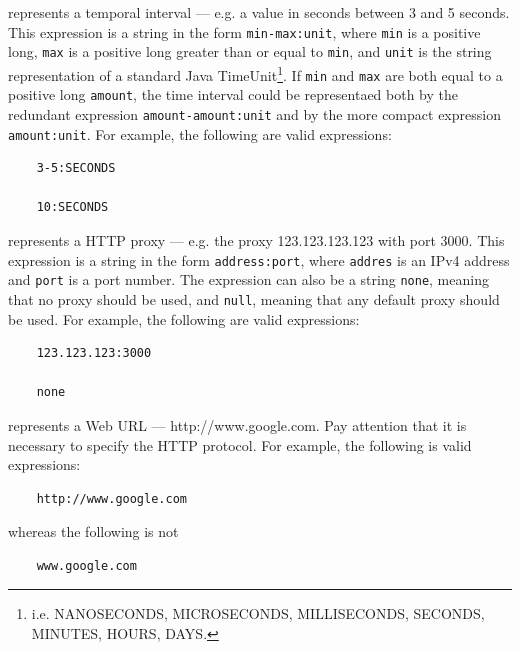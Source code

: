 \begin{description}
  \setlength\itemsep{1em}

  \item[time-expression] represents a temporal interval — e.g. a value in seconds between 3 and 5 seconds. This expression is a string in the form \texttt{min-max:unit}, where \texttt{min} is a positive long, \texttt{max} is a positive long greater than or equal to \texttt{min}, and \texttt{unit} is the string representation of a standard Java TimeUnit\footnote{i.e. NANOSECONDS, MICROSECONDS, MILLISECONDS, SECONDS, MINUTES, HOURS, DAYS.}. If \texttt{min} and \texttt{max} are both equal to a positive long \texttt{amount}, the time interval could be representaed both by the redundant expression \texttt{amount-amount:unit} and by the more compact expression \texttt{amount:unit}.
  For example, the following are valid expressions:

  \begin{verbatim}
    3-5:SECONDS

    10:SECONDS
  \end{verbatim}

  \item[proxy-expression] represents a HTTP proxy — e.g. the proxy 123.123.123.123 with port 3000. This expression is a string in the form \texttt{address:port}, where \texttt{addres} is an IPv4 address and \texttt{port} is a port number. The expression can also be a string \texttt{none}, meaning that no proxy should be used, and \texttt{null}, meaning that any default proxy should be used.
  For example, the following are valid expressions:

  \begin{verbatim}
    123.123.123:3000

    none
  \end{verbatim}

  \item[web-expression] represents a Web URL — http://www.google.com. Pay attention that it is necessary to specify the HTTP protocol.
  For example, the following is valid expressions:

  \begin{verbatim}
    http://www.google.com
  \end{verbatim}

  whereas the following is not

  \begin{verbatim}
    www.google.com
  \end{verbatim}


\end{description}
